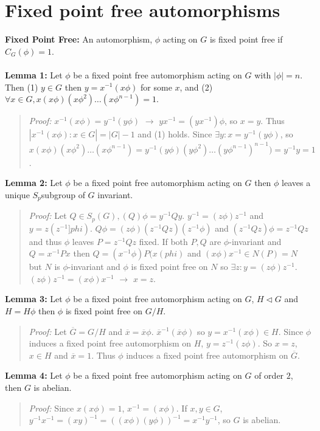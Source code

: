 \section {Fixed point free automorphisms} 
{\bf Fixed Point Free:}  An automorphism, $\phi$ acting on $G$ is fixed point free if $C_G(\phi) =1$.
\\
\\
{\bf Lemma 1:} Let $\phi$ be a fixed point free automorphism acting on $G$ with $|\phi|=n$.  Then
(1) $y \in G$ then $y= x^{-1}(x \phi)$ for some $x$, and 
(2) $\forall x \in G, x(x \phi) (x \phi^2) \ldots (x \phi^{n-1}) = 1$.
\begin{quote}
\emph{Proof:}  
$x^{-1}(x\phi) = y^{-1}(y\phi)$ $\rightarrow$ $y x^{-1} = (y x^{-1})\phi$, so $x=y$.  Thus
$|{x^{-1}(x\phi): x \in G}| = |G|-1$ and (1) holds. Since $\exists y: x= y^{-1}(y\phi)$, so
$x(x \phi) (x \phi^2) \ldots (x \phi^{n-1}) =
y^{-1}(y \phi) (y \phi^2) \ldots (y \phi^{n-1})^{n-1}) = y^{-1}y = 1$.
\end{quote}
{\bf Lemma 2:} Let $\phi$ be a fixed point free automorphism acting on $G$ then $\phi$
leaves a unique $S_p$subgroup of $G$ invariant.
\begin{quote}
\emph{Proof:}  
Let $Q \in S_p(G), (Q)\phi = y^{-1}Qy$.  $y^{-1}= (z\phi)z^{-1}$ and $y = z(z^{-1}]phi)$.
$Q\phi = (z\phi) (z^{-1}Q z) (z^{-1}\phi)$ and $(z^{-1}Qz)\phi= z^{-1}Qz$ and thus
$\phi$ leaves $P=z^{-1}Qz$ fixed.  If both $P, Q$ are $\phi$-invariant and 
$Q=x^{-1}Px$ then
$Q=(x^{-1}\phi)P(x(phi)$ and $(x\phi)x^{-1} \in N(P) = N$ but $N$ is $\phi$-invariant and
$\phi$ is fixed point free on $N$ so $\exists z: y=(z\phi)z^{-1}$.
$(z\phi)z^{-1}=
(x\phi)x^{-1}$ $\rightarrow$ $x=z$.
\end{quote}
{\bf Lemma 3:} Let $\phi$ be a fixed point free automorphism acting on $G$, $H \lhd G$ and $H= H\phi$ then
$\phi$ is fixed point free on $G/H$.
\begin{quote}
\emph{Proof:}  
Let ${\overline G} = G/H$ and ${\overline x} = {\overline x}\phi$.  ${\overline x}^{-1}({\overline x}\phi)$
so $y= x^{-1}(x\phi) \in H$.  Since $\phi$ induces a fixed point free automorphism on $H$, $y= z^{-1}(z\phi)$.
So $x = z$, $x \in H$ and ${\overline x} = 1$.  Thus $\phi$ induces a fixed point free automorphism on
${\overline G}$.
\end{quote}
{\bf Lemma 4:} Let $\phi$ be a fixed point free automorphism acting on $G$ of order $2$, then $G$ is abelian.
\begin{quote}
\emph{Proof:}  
Since $x(x\phi) = 1$, $x^{-1} = (x\phi)$.  If 
$x, y \in G$, $y^{-1}x^{-1} = (xy)^{-1}= ((x\phi)(y\phi))^{-1} = x^{-1} y^{-1}$, so $G$ is abelian.
\end{quote}

